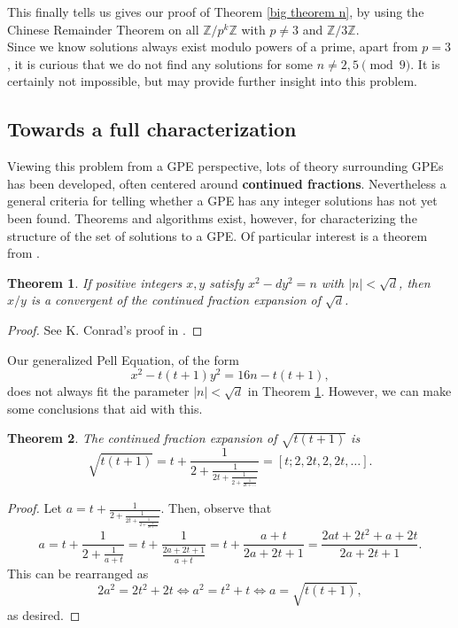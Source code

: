 \documentclass[12pt]{amsart}
\theoremstyle{theorem}
\newtheorem{theorem}{Theorem}
\theoremstyle{definition}
\theoremstyle{plain}
\begin{document}
This finally tells us gives our proof of Theorem \ref{big theorem n}, by using the Chinese Remainder Theorem on all $\mathbb{Z} / p^k \mathbb{Z}$ with $p \neq 3$ and $\mathbb{Z} / 3 \mathbb{Z}$. 
\\

Since we know solutions always exist modulo powers of a prime, apart from $p=3$, it is curious that we do not find any solutions for some $n \neq 2, 5 \pmod{9}$. It is certainly not impossible, but may provide further insight into this problem.

\subsection{Towards a full characterization}

Viewing this problem from a GPE perspective, lots of theory surrounding GPEs has been developed, often centered around \textbf{continued fractions}. Nevertheless a general criteria for telling whether a GPE has any integer solutions has not yet been found. Theorems and algorithms exist, however, for characterizing the structure of the set of solutions to a GPE. Of particular interest is a theorem from \cite{b10}.

\begin{theorem}\label{convergent}
If positive integers $x,y$ satisfy $x^2 - dy^2 = n$ with $|n| < \sqrt{d}$, then $x/y$ is a convergent of the continued fraction expansion of $\sqrt{d}$.   
\end{theorem}

\begin{proof}
    See K. Conrad's proof in \cite{b11}.
\end{proof}

Our generalized Pell Equation, of the form $$x^2 - t(t+1) y^2 = 16n - t(t+1),$$ does not always fit the parameter $|n| < \sqrt{d}$ in Theorem \ref{convergent}. However, we can make some conclusions that aid with this.
\\

\begin{theorem}\label{cf of triangular num}
The continued fraction expansion of $\sqrt{t(t+1)}$ is $$\sqrt{t(t+1)} = t + \frac{1}{2 + \frac{1}{2t + \frac{1}{2 + \frac{1}{2t +\dots}}}} = [t; 2, 2t, 2, 2t, \dots].$$
\end{theorem}

\begin{proof}
    Let $a =t +\frac{1}{2 + \frac{1}{2t + \frac{1}{2 + \frac{1}{2t +\dots}}}}$. Then, observe that $$a = t + \frac{1}{2 + \frac{1}{a+t}} = t + \frac{1}{\frac{2a+2t+1}{a+t}} = t + \frac{a+t}{2a+2t+1} = \frac{2at + 2t^2 + a + 2t}{2a+2t+1}.$$ This can be rearranged as $$2a^2 = 2t^2 + 2t \iff a^2 = t^2 + t \iff a = \sqrt{t(t+1)},$$ as desired. 
\end{proof}
\end{document}
